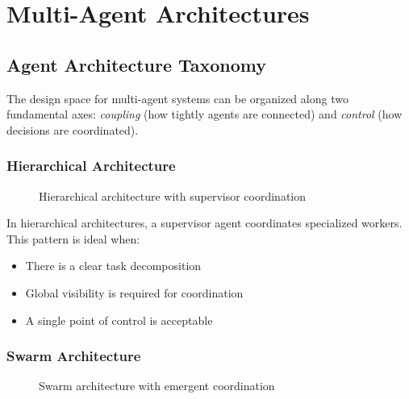 \documentclass[11pt,a4paper]{article}
\theoremstyle{definition}
\theoremstyle{remark}
\begin{document}

\section{Multi-Agent Architectures}
\label{sec:multiagent}

\subsection{Agent Architecture Taxonomy}

The design space for multi-agent systems can be organized along two fundamental axes: \textit{coupling} (how tightly agents are connected) and \textit{control} (how decisions are coordinated).

\subsubsection{Hierarchical Architecture}

\begin{figure}[H]
    \centering
    
    \caption{Hierarchical architecture with supervisor coordination}
    \label{fig:hierarchical}
\end{figure}

In hierarchical architectures, a supervisor agent coordinates specialized workers. This pattern is ideal when:
\begin{itemize}
    \item There is a clear task decomposition
    \item Global visibility is required for coordination
    \item A single point of control is acceptable
\end{itemize}

\subsubsection{Swarm Architecture}

\begin{figure}[H]
    \centering
    
    \caption{Swarm architecture with emergent coordination}
    \label{fig:swarm}
\end{figure}
\end{document}

